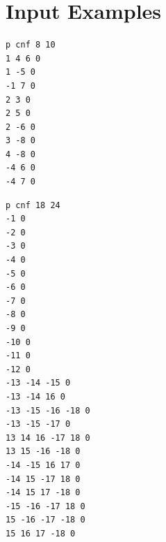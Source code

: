 \documentclass[a4paper, 12pt, bibliography=totoc]{scrartcl}
\begin{document}
\section{Input Examples}

\lstset{numbers=none}

\begin{lstlisting}[caption={CNF clauses from example 4.1 on page 27 \cite{DiplomarbeitZisser}}, label={lst:clausesDA41}]
p cnf 8 10
1 4 6 0
1 -5 0
-1 7 0
2 3 0
2 5 0
2 -6 0
3 -8 0
4 -8 0
-4 6 0
-4 7 0
\end{lstlisting}
\begin{lstlisting}[caption={CNF clauses from random example with 12 units},label={lst:example18-24}]
p cnf 18 24
-1 0
-2 0
-3 0
-4 0
-5 0
-6 0
-7 0
-8 0
-9 0
-10 0
-11 0
-12 0
-13 -14 -15 0
-13 -14 16 0
-13 -15 -16 -18 0
-13 -15 -17 0
13 14 16 -17 18 0
13 15 -16 -18 0
-14 -15 16 17 0
-14 15 -17 18 0
-14 15 17 -18 0
-15 -16 -17 18 0
15 -16 -17 -18 0
15 16 17 -18 0
\end{lstlisting}



\newpage
\printbibliography
%
\end{document}
